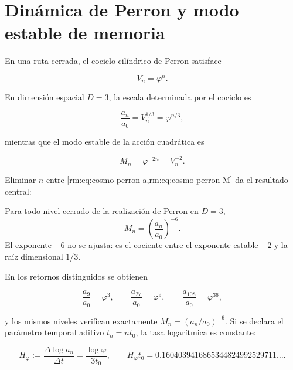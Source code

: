 \section{Din\'amica de Perron y modo estable de memoria}

En una ruta cerrada, el cociclo cil\'indrico de Perron satisface

\begin{equation}
V_n=\varphi^n.
\label{rm:eq:cosmo-perron-V}
\end{equation}

En dimensi\'on espacial \(D=3\), la escala determinada por el cociclo es

\begin{equation}
\frac{a_n}{a_0}=V_n^{1/3}=\varphi^{n/3},
\label{rm:eq:cosmo-perron-a}
\end{equation}

mientras que el modo estable de la acci\'on cuadr\'atica es

\begin{equation}
M_n=\varphi^{-2n}=V_n^{-2}.
\label{rm:eq:cosmo-perron-M}
\end{equation}

Eliminar \(n\) entre \cref{rm:eq:cosmo-perron-a,rm:eq:cosmo-perron-M} da el
resultado central:

\begin{theorem}
Para todo nivel cerrado de la realizaci\'on de Perron en \(D=3\),
\begin{equation}
\boxed{
M_n=\left(\frac{a_n}{a_0}\right)^{-6}.}
\label{rm:eq:cosmo-minus-six}
\end{equation}
El exponente \(-6\) no se ajusta: es el cociente entre el exponente estable
\(-2\) y la ra\'iz dimensional \(1/3\).
\end{theorem}

En los retornos distinguidos se obtienen

\[
\frac{a_9}{a_0}=\varphi^3,
\qquad
\frac{a_{27}}{a_0}=\varphi^9,
\qquad
\frac{a_{108}}{a_0}=\varphi^{36},
\]

y los mismos niveles verifican exactamente
\(M_n=(a_n/a_0)^{-6}\). Si se declara el par\'ametro temporal aditivo \(t_n=nt_0\), la tasa
logar\'itmica es constante:

\begin{equation}
H_\varphi
:=\frac{\Delta\log a_n}{\Delta t}
=\frac{\log\varphi}{3t_0},
\qquad
H_\varphi t_0
=0.1604039416865344824992529711\ldots.
\label{rm:eq:cosmo-Hphi}
\end{equation}

